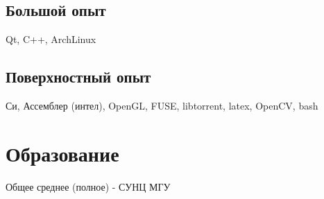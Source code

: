 \documentclass[a4paper, 8pt]{article}
\begin{document}
{{	\subsection{Большой опыт} {Qt, C++, ArchLinux}
	\subsection{Поверхностный опыт} {Си, Ассемблер (интел), OpenGL, FUSE, libtorrent, latex, OpenCV, bash}
}

\section{Образование} {
    Общее среднее (полное) - СУНЦ МГУ
}

}
\end{document}
